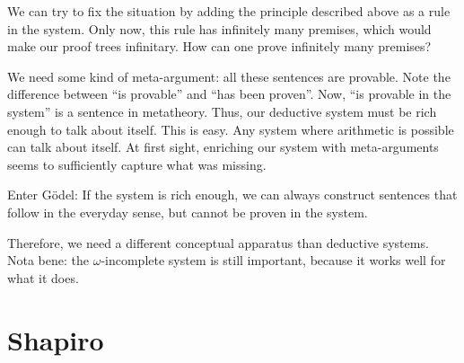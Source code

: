 \documentclass[a4paper]{article}
\begin{document}
We can try to fix the situation by adding the principle described above as a
rule in the system.  Only now, this rule has infinitely many premises, which
would make our proof trees infinitary.  How can one prove infinitely many
premises?

We need some kind of meta-argument: all these sentences are provable.  Note the
difference between ``is provable'' and ``has been proven''.  Now, ``is provable
in the system'' is a sentence in metatheory.  Thus, our deductive system must be
rich enough to talk about itself.  This is easy.  Any system where arithmetic is
possible can talk about itself.  At first sight, enriching our system with
meta-arguments seems to sufficiently capture what was missing.

Enter Gödel: If the system is rich enough, we can always construct sentences
that follow in the everyday sense, but cannot be proven in the system.

Therefore, we need a different conceptual apparatus than deductive systems.
Nota bene: the $\omega$-incomplete system is still important, because it works
well for what it does.

\section{Shapiro}



\end{document}
